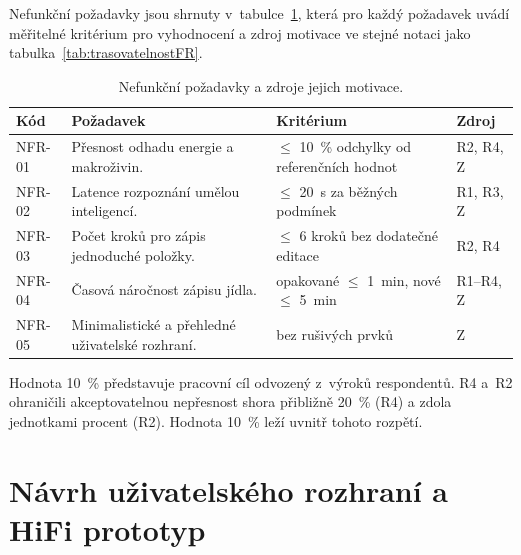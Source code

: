 Nefunkční požadavky jsou shrnuty v~tabulce~\ref{tab:nfr}, která pro každý požadavek uvádí měřitelné kritérium pro vyhodnocení a zdroj motivace ve stejné notaci jako tabulka~\ref{tab:trasovatelnostFR}.

\begin{table}[!htbp]
\centering
\begin{footnotesize}
\renewcommand{\arraystretch}{1.35}
\setlength{\tabcolsep}{4pt}
\begin{threeparttable}
\begin{tabular}{@{}l>{\raggedright\arraybackslash}p{5.0cm}>{\raggedright\arraybackslash}p{2.9cm}>{\raggedright\arraybackslash}p{1.5cm}@{}}
	\toprule
	\rowcolor{white}\textbf{Kód} & \textbf{Požadavek} & \textbf{Kritérium} & \textbf{Zdroj} \\
	\midrule
	NFR-01 & Přesnost odhadu energie a makroživin.\tnote{1} & $\leq$ 10~\% odchylky od referenčních hodnot & R2, R4, Z \\
	NFR-02 & Latence rozpoznání umělou inteligencí. & $\leq$ 20~s za běžných podmínek & R1, R3, Z \\
	NFR-03 & Počet kroků pro zápis jednoduché položky. & $\leq$ 6 kroků bez dodatečné editace & R2, R4 \\
	NFR-04 & Časová náročnost zápisu jídla. & opakované $\leq$ 1~min, nové $\leq$ 5~min & R1--R4, Z \\
	NFR-05 & Minimalistické a přehledné uživatelské rozhraní. & bez rušivých prvků & Z \\
	\bottomrule
\end{tabular}
\begin{tablenotes}
\item[\textsuperscript{1}] Hodnota 10~\% představuje pracovní cíl odvozený z~výroků respondentů. R4 a~R2 ohraničili akceptovatelnou nepřesnost shora přibližně 20~\% (R4) a zdola jednotkami procent (R2). Hodnota 10~\% leží uvnitř tohoto rozpětí.
\end{tablenotes}
\end{threeparttable}
\end{footnotesize}
\caption{Nefunkční požadavky a zdroje jejich motivace.}
\label{tab:nfr}
\end{table}

\section{Návrh uživatelského rozhraní a HiFi prototyp}
\label{sec:prototyp}

